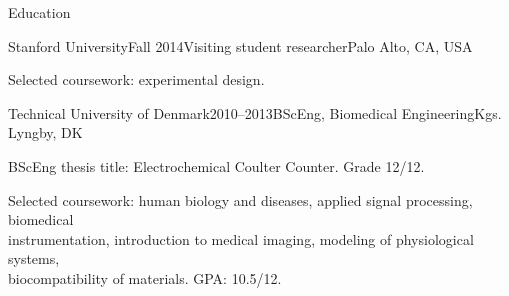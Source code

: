 \documentclass{resume} %
\begin{document}
\begin{rSection}{Education}
	\begin{rSubsection}{Stanford University}{Fall 2014}{Visiting student researcher}{Palo Alto, CA, USA}
		\item Selected coursework: experimental design.
	\end{rSubsection}
	
	\begin{rSubsection}{Technical University of Denmark}{2010--2013}{BScEng, Biomedical Engineering}{Kgs. Lyngby, DK}
	    \item BScEng thesis title: Electrochemical Coulter Counter. Grade 12/12.
		\item Selected coursework: human biology and diseases, applied signal processing, biomedical \\instrumentation, introduction to medical imaging, modeling of physiological systems, \\biocompatibility of materials. GPA: 10.5/12.
	\end{rSubsection}
	
	
	
	

\end{rSection}
\end{document}

